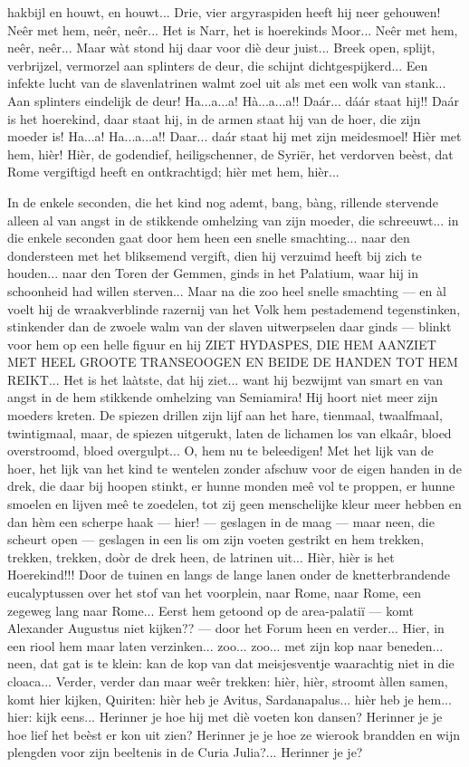 \documentclass[a4paper, 12pt, oneside, dutch]{article}
\begin{document}
hakbijl en houwt, en houwt... Drie, vier argyraspiden heeft hij neer gehouwen! Neêr met hem, neêr, neêr... Het is Narr, het is hoerekinds Moor... Neêr met hem, neêr, neêr... Maar wàt stond hij daar voor diè deur juist... Breek open, splijt, verbrijzel, vermorzel aan splinters de deur, die schijnt dichtgespijkerd... Een infekte lucht van de slavenlatrinen walmt zoel uit als met een wolk van stank... Aan splinters eindelijk de deur! Ha...a...a! Hà...a...a!! Daár... dáár staat hij!! Daár is het hoerekind, daar staat hij, in de armen staat hij van de hoer, die zijn moeder is! Ha...a! Ha...a...a!! Daar... daár staat hij met zijn meidesmoel! Hièr met hem, hièr! Hièr, de godendief, heiligschenner, de Syriër, het verdorven beèst, dat Rome vergiftigd heeft en ontkrachtigd; hièr met hem, hièr...

In de enkele seconden, die het kind nog ademt, bang, bàng, rillende stervende alleen al van angst in de stikkende omhelzing van zijn moeder, die schreeuwt... in die enkele seconden gaat door hem heen een snelle smachting... naar den dondersteen met het bliksemend vergift, dien hij verzuimd heeft bij zich te houden... naar den Toren der Gemmen, ginds in het Palatium, waar hij in schoonheid had willen sterven... Maar na die zoo heel snelle smachting --- en àl voelt hij de wraakverblinde razernij van het Volk hem pestademend tegenstinken, stinkender dan de zwoele walm van der slaven uitwerpselen daar ginds --- blinkt voor hem op een helle figuur en hij ZIET HYDASPES, DIE HEM AANZIET MET HEEL GROOTE TRANSEOOGEN EN BEIDE DE HANDEN TOT HEM REIKT... Het is het laàtste, dat hij ziet... want hij bezwijmt van smart en van angst in de hem stikkende omhelzing van Semiamira! Hij hoort niet meer zijn moeders kreten. De spiezen drillen zijn lijf aan het hare, tienmaal, twaalfmaal, twintigmaal, maar, de spiezen uitgerukt, laten de lichamen los van elkaâr, bloed overstroomd, bloed overgulpt... O, hem nu te beleedigen! Met het lijk van de hoer, het lijk van het kind te wentelen zonder afschuw voor de eigen handen in de drek, die daar bij hoopen stinkt, er hunne monden meê vol te proppen, er hunne smoelen en lijven meê te zoedelen, tot zij geen menschelijke kleur meer hebben en dan hèm een scherpe haak --- hier! --- geslagen in de maag --- maar neen, die scheurt open --- geslagen in een lis om zijn voeten gestrikt en hem trekken, trekken, trekken, doòr de drek heen, de latrinen uit... Hièr, hièr is het Hoerekind!!! Door de tuinen en langs de lange lanen onder de knetterbrandende eucalyptussen over het stof van het voorplein, naar Rome, naar Rome, een zegeweg lang naar Rome... Eerst hem getoond op de area-palatiï --- komt Alexander Augustus niet kijken?? --- door het Forum heen en verder... Hier, in een riool hem maar laten verzinken... zoo... zoo... met zijn kop naar beneden... neen, dat gat is te klein: kan de kop van dat meisjesventje waarachtig niet in die cloaca... Verder, verder dan maar weêr trekken: hièr, hièr, stroomt àllen samen, komt hier kijken, Quiriten: hièr heb je Avitus, Sardanapalus... hièr heb je hem... hier: kijk eens... Herinner je hoe hij met diè voeten kon dansen? Herinner je je hoe lief het beèst er kon uit zien? Herinner je je hoe ze wierook brandden en wijn plengden voor zijn beeltenis in de Curia Julia?... Herinner je je? 
\end{document}
